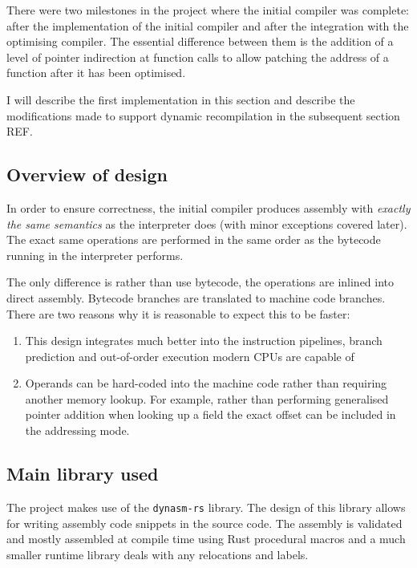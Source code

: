 There were two milestones in the project where the initial compiler was complete: after the
implementation of the initial compiler and after the integration with the optimising compiler. The
essential difference between them is the addition of a level of pointer indirection at function
calls to allow patching the address of a function after it has been optimised.

I will describe the first implementation in this section and describe the modifications made to
support dynamic recompilation in the subsequent section REF.

\subsection{Overview of design}

In order to ensure correctness, the initial compiler produces assembly with \emph{exactly the same
    semantics} as the interpreter does (with minor exceptions covered later). The exact same
operations
are performed in the same order as the bytecode running in the interpreter performs.

The only difference is rather than use bytecode, the operations are inlined into direct assembly.
Bytecode branches are translated to machine code branches. There are two reasons why it is
reasonable to expect this to be faster:

\begin{enumerate}
    \item This design integrates much better into the instruction pipelines, branch prediction and
          out-of-order execution modern CPUs are capable of
    \item Operands can be hard-coded into the machine code rather than requiring another memory
          lookup. For example, rather than performing generalised pointer addition when looking up
          a field
          the exact offset can be included in the addressing mode.
\end{enumerate}

\subsection{Main library used}

The project makes use of the \texttt{dynasm-rs} library. The design of this library allows for
writing assembly code snippets in the source code. The assembly is validated and mostly assembled
at compile time using Rust procedural macros and a much smaller runtime library deals with any
relocations and labels.

